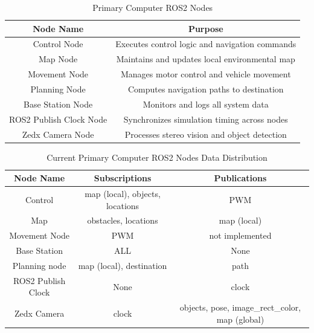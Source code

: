 \begin{table}[H]
    \centering
    \begin{tabular}{|c|c|}
        \hline
        \textbf{Node Name} & \textbf{Purpose} \\
        \hline
        Control Node & Executes control logic and navigation commands \\
        Map Node & Maintains and updates local environmental map \\
        Movement Node & Manages motor control and vehicle movement \\
        Planning Node & Computes navigation paths to destination \\
        Base Station Node & Monitors and logs all system data \\
        ROS2 Publish Clock Node & Synchronizes simulation timing across nodes \\
        Zedx Camera Node & Processes stereo vision and object detection \\
        \hline
    \end{tabular}
    \caption{Primary Computer ROS2 Nodes}
    \label{tab:ros2-nodes-overview}
\end{table}


\begin{table}[H]
    \centering
    \begin{tabular}{|c|c|c|}
        \hline
        \textbf{Node Name} & \textbf{Subscriptions} & \textbf{Publications} \\
        \hline
        Control & map (local), objects, locations &  PWM \\
        Map & obstacles, locations & map (local) \\
        Movement Node & PWM & not implemented \\
        Base Station & ALL & None \\
        Planning node & map (local), destination & path\\
        ROS2 Publish Clock & None & clock \\
        Zedx Camera & clock\footnotemark & objects, pose, image\_rect\_color, map (global) \\
        \hline
    \end{tabular}
    \caption{Current Primary Computer ROS2 Nodes Data Distribution}
    \label{tab:current-ros2-nodes}
\end{table}

